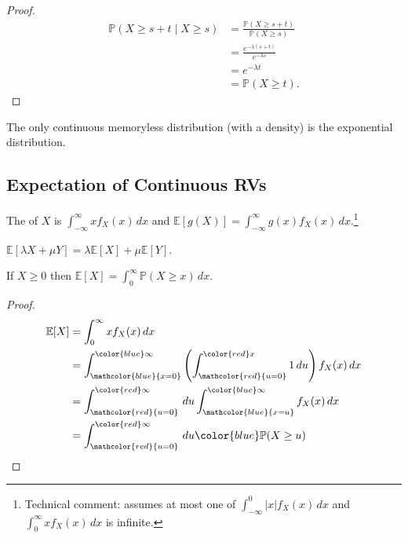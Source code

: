 \begin{proof}
    \begin{align*}
        \mathbb{P}(X \geq s + t \mid X \geq s) &= \frac{\mathbb{P}(X \geq s + t)}{\mathbb{P}(X \geq s)} \\
        &= \frac{e^{-\lambda(s + t)}}{e^{-\lambda s}} \\
        &= e^{-\lambda t} \\
        &= \mathbb{P}(X \geq t).
    \end{align*} 
\end{proof} 

\begin{note}
    The only continuous memoryless distribution (with a density) is the exponential distribution.
\end{note} 

\subsection{Expectation of Continuous RVs}
\begin{definition}[Expectation]
    The  of $X$ is $\int_{-\infty}^{\infty} x f_X(x) \,dx$ and $\mathbb{E}[g(X)] = \int_{-\infty}^{\infty} g(x) f_X(x) \,dx$.\footnote{\color{blue} Technical comment: assumes at most one of $\int_{-\infty}^{0} |x| f_X(x) \,dx$ and $\int_{0}^{\infty} x f_X(x) \,dx$ is infinite.}
\end{definition} 

\begin{claim}
    $\mathbb{E}[\lambda X + \mu Y] = \lambda \mathbb{E}[X] + \mu \mathbb{E}[Y]$.
\end{claim} 

\begin{claim}
    If $X \geq 0$ then $\mathbb{E}[X] = \int_{0}^{\infty} \mathbb{P}(X \geq x) \,dx$.
\end{claim} 

\begin{proof}
    \begin{align*}
        \mathbb{E}[X] &= \int_{0}^{\infty} x f_X(x) \,dx \\
        &= \int_{\mathcolor{blue}{x=0}}^{\color{blue} \infty} \left( \int_{\mathcolor{red}{u = 0}}^{\color{red} x} 1 \,du \right) f_X(x) \,dx \\
        &= \int_{\mathcolor{red}{u = 0}}^{\color{red} \infty} \,du \int_{\mathcolor{blue}{x = u}}^{\color{blue} \infty} f_X(x) \,dx \\
        &= \int_{\mathcolor{red}{u = 0}}^{\color{red} \infty} \,du \color{blue} \mathbb{P}(X \geq u)
    \end{align*} 
\end{proof} 

